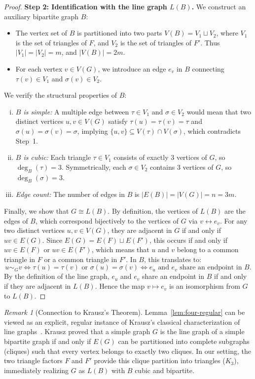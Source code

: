 \documentclass[11pt,reqno]{amsart}
\theoremstyle{definition}
\theoremstyle{remark}
\newtheorem{remark}[theorem]{Remark}
\begin{document}
\begin{proof}
\medskip
\noindent\textbf{Step 2: Identification with the line graph $L(B)$.}
We construct an auxiliary bipartite graph $B$:
\begin{itemize}
    \item The vertex set of $B$ is partitioned into two parts $V(B) = V_1 \sqcup V_2$, where $V_1$ is the set of triangles of $F$, and $V_2$ is the set of triangles of $F'$. Thus $|V_1| = |V_2| = m$, and $|V(B)| = 2m$.
    \item For each vertex $v \in V(G)$, we introduce an edge $e_v$ in $B$ connecting $\tau(v) \in V_1$ and $\sigma(v) \in V_2$.
\end{itemize}
We verify the structural properties of $B$:
\begin{enumerate}[(i)]
    \item \emph{$B$ is simple:} A multiple edge between $\tau \in V_1$ and $\sigma \in V_2$ would mean that two distinct vertices $u, v \in V(G)$ satisfy $\tau(u) = \tau(v) = \tau$ and $\sigma(u) = \sigma(v) = \sigma$, implying $\{u, v\} \subseteq V(\tau) \cap V(\sigma)$, which contradicts Step~1.
    \item \emph{$B$ is cubic:} Each triangle $\tau \in V_1$ consists of exactly 3 vertices of $G$, so $\deg_B(\tau) = 3$. Symmetrically, each $\sigma \in V_2$ contains 3 vertices of $G$, so $\deg_B(\sigma) = 3$.
    \item \emph{Edge count:} The number of edges in $B$ is $|E(B)| = |V(G)| = n = 3m$.
\end{enumerate}
Finally, we show that $G \cong L(B)$. By definition, the vertices of $L(B)$ are the edges of $B$, which correspond bijectively to the vertices of $G$ via $v \leftrightarrow e_v$. For any two distinct vertices $u, v \in V(G)$, they are adjacent in $G$ if and only if $uv \in E(G)$. Since $E(G) = E(F) \sqcup E(F')$, this occurs if and only if $uv \in E(F)$ or $uv \in E(F')$, which means that $u$ and $v$ belong to a common triangle in $F$ or a common triangle in $F'$. In $B$, this translates to:
\[
u \sim_G v \iff \tau(u) = \tau(v) \text{ or } \sigma(u) = \sigma(v) \iff e_u \text{ and } e_v \text{ share an endpoint in } B.
\]
By the definition of the line graph, $e_u$ and $e_v$ share an endpoint in $B$ if and only if they are adjacent in $L(B)$. Hence the map $v \mapsto e_v$ is an isomorphism from $G$ to $L(B)$.
\end{proof}

\begin{remark}[Connection to Krausz's Theorem]\label{rem:krausz}
Lemma~\ref{lem:four-regular} can be viewed as an explicit, regular instance of Krausz's classical characterization of line graphs~\cite{Krausz43}. Krausz proved that a simple graph $G$ is the line graph of a simple bipartite graph if and only if $E(G)$ can be partitioned into complete subgraphs (cliques) such that every vertex belongs to exactly two cliques. In our setting, the two triangle factors $F$ and $F'$ provide this clique partition into triangles ($K_3$), immediately realizing $G$ as $L(B)$ with $B$ cubic and bipartite.
\end{remark}
\end{document}
